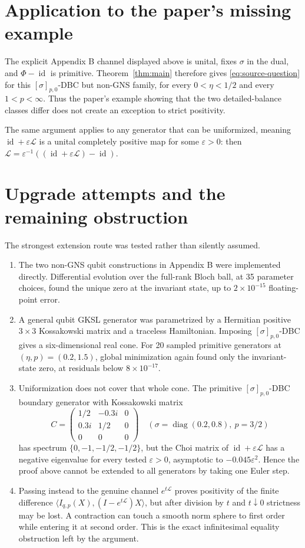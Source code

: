 \documentclass[11pt]{article}
\newcommand{\id}{\operatorname{id}}
\newcommand{\cL}{\mathcal L}
\begin{document}
\section{Application to the paper's missing example}

The explicit Appendix B channel displayed above is unital, fixes $\sigma$ in
the dual, and $\Phi-\id$ is primitive.  Theorem~\ref{thm:main} therefore gives
\eqref{eq:source-question} for this $[\sigma]_{p,0}$-DBC but non-GNS family,
for every $0<\eta<1/2$ and every $1<p<\infty$.  Thus the paper's example
showing that the two detailed-balance classes differ does not create an
exception to strict positivity.

The same argument applies to any generator that can be uniformized, meaning
$\id+\varepsilon\cL$ is a unital completely positive map for some
$\varepsilon>0$: then
$\cL=\varepsilon^{-1}((\id+\varepsilon\cL)-\id)$.

\section{Upgrade attempts and the remaining obstruction}

The strongest extension route was tested rather than silently assumed.

\begin{enumerate}
\item The two non-GNS qubit constructions in Appendix B were implemented
directly.  Differential evolution over the full-rank Bloch ball, at 35
parameter choices, found the unique zero at the invariant state, up to
$2\times10^{-15}$ floating-point error.
\item A general qubit GKSL generator was parametrized by a Hermitian positive
$3\times3$ Kossakowski matrix and a traceless Hamiltonian.  Imposing
$[\sigma]_{p,0}$-DBC gives a six-dimensional real cone.  For 20 sampled
primitive generators at $(\eta,p)=(0.2,1.5)$, global minimization again found
only the invariant-state zero, at residuals below $8\times10^{-17}$.
\item Uniformization does not cover that whole cone.  The primitive
$[\sigma]_{p,0}$-DBC boundary generator with Kossakowski matrix
\[
 C=\begin{pmatrix}1/2&-0.3i&0\\0.3i&1/2&0\\0&0&0\end{pmatrix}
 \quad(\sigma=\operatorname{diag}(0.2,0.8),\ p=3/2)
\]
has spectrum $\{0,-1,-1/2,-1/2\}$, but the Choi matrix of
$\id+\varepsilon\cL$ has a negative eigenvalue for every tested
$\varepsilon>0$, asymptotic to $-0.045\varepsilon^2$.  Hence the proof above
cannot be extended to all generators by taking one Euler step.
\item Passing instead to the genuine channel $e^{t\cL}$ proves positivity of
the finite difference
$\langle I_{q,p}(X),(I-e^{t\cL})X\rangle$, but after division by $t$ and
$t\downarrow0$ strictness may be lost.  A contraction can touch a smooth norm
sphere to first order while entering it at second order.  This is the exact
infinitesimal equality obstruction left by the argument.
\end{enumerate}
\end{document}
